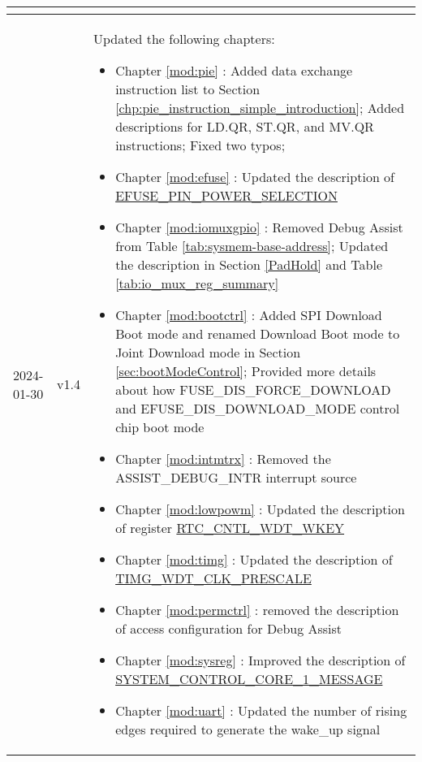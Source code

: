 \begin{longtable}[l]{ | m{2cm} | m{1.5cm} | m{12cm} | }
\begin{itemize}
        \end{itemize}
    \\\hline
    2024-01-30      & v1.4  &
    Updated the following chapters:
    \begin{itemize}
        \item Chapter \ref{mod:pie} \textit{\nameref{mod:pie}}: Added data exchange instruction list to Section \ref{chp:pie_instruction_simple_introduction}; Added descriptions for LD.QR, ST.QR, and MV.QR instructions; Fixed two typos; %
        \item Chapter \ref{mod:efuse} \textit{\nameref{mod:efuse}}: Updated the description of \hyperref[fielddesc:EFUSEPINPOWERSELECTION]{EFUSE\_PIN\_POWER\_SELECTION} %
        \item Chapter \ref{mod:iomuxgpio} \textit{\nameref{mod:iomuxgpio}}: Removed Debug Assist from Table \ref{tab:sysmem-base-address}; Updated the description in Section \ref{PadHold} and Table \ref{tab:io_mux_reg_summary} %
        \item Chapter \ref{mod:bootctrl} \textit{\nameref{mod:bootctrl}}: Added SPI Download Boot mode and renamed Download Boot mode to Joint Download mode in Section \ref{sec:bootModeControl}; Provided more details about how FUSE\_DIS\_FORCE\_DOWNLOAD and EFUSE\_DIS\_DOWNLOAD\_MODE control chip boot mode %
        \item Chapter \ref{mod:intmtrx} \textit{\nameref{mod:intmtrx}}: Removed the ASSIST\_DEBUG\_INTR interrupt source %
        \item Chapter \ref{mod:lowpowm} \textit{\nameref{mod:lowpowm}}: Updated the description of register \hyperref[fielddesc:RTCCNTLWDTWKEY]{RTC\_CNTL\_WDT\_WKEY}%
        \item Chapter \ref{mod:timg} \textit{\nameref{mod:timg}}: Updated the description of \hyperref[fielddesc:TIMGWDTCLKPRESCALE]{TIMG\_WDT\_CLK\_PRESCALE} %
        \item Chapter \ref{mod:permctrl} \textit{\nameref{mod:permctrl}}: removed the description of access configuration for Debug Assist  %
        \item Chapter \ref{mod:sysreg} \textit{\nameref{mod:sysreg}}: Improved the description of \hyperref[fielddesc:SYSTEMCONTROLCORE1MESSAGE]{SYSTEM\_CONTROL\_CORE\_1\_MESSAGE}%
        \item Chapter \ref{mod:uart} \textit{\nameref{mod:uart}}: Updated the number of rising edges required to generate the wake\_up signal %

\end{itemize}
\end{longtable}
